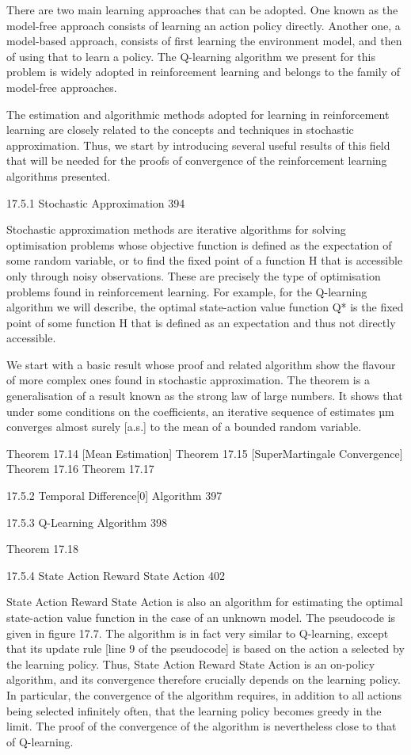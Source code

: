 There are two main learning approaches that can be adopted. One known as the model-free approach consists of learning an action policy directly. Another one, a model-based approach, consists of first learning the environment model, and then of using that to learn a policy. The Q-learning algorithm we present for this problem is widely adopted in reinforcement learning and belongs to the family of model-free approaches.

The estimation and algorithmic methods adopted for learning in reinforcement learning are closely related to the concepts and techniques in stochastic approximation. Thus, we start by introducing several useful results of this field that will be needed for the proofs of convergence of the reinforcement learning algorithms presented.

17.5.1 Stochastic Approximation 394

Stochastic approximation methods are iterative algorithms for solving optimisation problems whose objective function is defined as the expectation of some random variable, or to find the fixed point of a function H that is accessible only through noisy observations. These are precisely the type of optimisation problems found in reinforcement learning. For example, for the Q-learning algorithm we will describe, the optimal state-action value function Q* is the fixed point of some function H that is defined as an expectation and thus not directly accessible.

We start with a basic result whose proof and related algorithm show the flavour of more complex ones found in stochastic approximation. The theorem is a generalisation of a result known as the strong law of large numbers. It shows that under some conditions on the coefficients, an iterative sequence of estimates µm converges almost surely [a.s.] to the mean of a bounded random variable.

Theorem 17.14 [Mean Estimation]
Theorem 17.15 [SuperMartingale Convergence]
Theorem 17.16
Theorem 17.17

17.5.2 Temporal Difference[0] Algorithm 397



17.5.3 Q-Learning Algorithm 398

Theorem 17.18

17.5.4 State Action Reward State Action 402

State Action Reward State Action is also an algorithm for estimating the optimal state-action value function in the case of an unknown model. The pseudocode is given in figure 17.7. The algorithm is in fact very similar to Q-learning, except that its update rule [line 9 of the pseudocode] is based on the action a selected by the learning policy. Thus, State Action Reward State Action is an on-policy algorithm, and its convergence therefore crucially depends on the learning policy. In particular, the convergence of the algorithm requires, in addition to all actions being selected infinitely often, that the learning policy becomes greedy in the limit. The proof of the convergence of the algorithm is nevertheless close to that of Q-learning.

